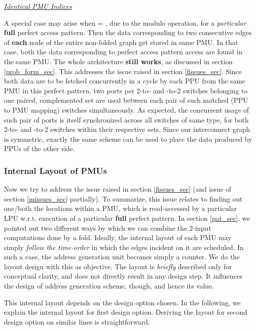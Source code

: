 \documentclass[12pt]{article}
\begin{document}
\noindent \uline{\textit{Identical PMU Indices}}

A special case may arise when  = , due to the modulo operation,
for a \textit{particular} \textbf{full} perfect access pattern. Then
the data corresponding to two consecutive edges of
\textbf{each} node of the entire non-folded graph get stored in same PMU.
In that case, both the data corresponding to  perfect access pattern
access are found in the same PMU. The whole architecture
\textbf{still works}, as discussed in section \ref{prob_form_sec}. This
addresses the  issue raised in section \ref{fissues_sec}.
Since both data are to be fetched concurrently in a cycle by each
PPU from the same PMU in this perfect pattern, two ports per 2-to- and -to-2
switches belonging to one paired, complemented set are used between each
pair of such matched (PPU to PMU mapping)
switches simultaneously. As expected, the concurrent usage of such pair of
ports is itself synchronized across all switches of same type, for both
2-to- and -to-2 switches within their respective sets.
Since our interconnect graph is symmetric, exactly the same scheme can be
used to place the data produced by PPUs of the other side.

\subsubsection{Internal Layout of PMUs}
\label{mem_lout_sec}
Now we try to address the  issue raised in section
\ref{fissues_sec} (and  issue of section \ref{missues_sec}
partially). To summarize, this issue relates to finding out
one/both the locations within a PMU, which is read-accessed by a
particular LPU w.r.t. execution of a particular \textbf{full} perfect
pattern. In section \ref{pat_sec}, we pointed out two different ways by
which we can combine the 2-input computations done by a fold. Ideally, the
internal layout of each PMU may simply \textit{follow the
time-order} in which the edges incident on it are scheduled. In such a
case, the address generation unit becomes simply a counter. We do
the layout design with this as objective. The layout is
\textit{briefly} described
only for conceptual clarity, and does not directly result in any design
step. It influences the design of address generation scheme, though, and
hence its value.

This internal layout depends on the design option chosen. In the
following, we explain the internal layout for first design option.
Deriving the layout for second design option on similar lines is
straightforward.
\end{document}
